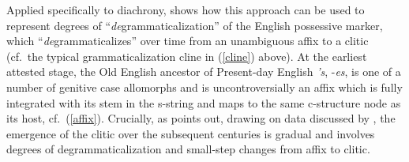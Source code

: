 \documentclass[output=paper,hidelinks]{langscibook}
\begin{document}
\begin{exe}

\ex {}
\end{exe}
\clearpage


Applied specifically to diachrony, \citet{Lowe15} shows how this approach can be used to represent degrees of ``\textit{de}grammaticalization'' of the English possessive marker, which ``\textit{de}grammaticalizes'' over time from an unambiguous affix to a clitic (cf.~the typical grammaticalization cline in (\ref{cline}) above). At the earliest attested stage, the Old English ancestor of Present-day English \textit{'s}, -\textit{es}, is one of a number of genitive case allomorphs and is uncontroversially an affix which is fully integrated with its stem in the s-string and  maps to the same c-structure node as its host, cf.~(\ref{affix}). 
Crucially, as \citet{Lowe15} points out, drawing on data discussed by \citet{allen1997origins,allen2003deflexion,allen2008genitives}, the emergence of the clitic over the subsequent centuries is gradual and involves degrees of degrammaticalization and small-step changes  from affix to clitic. 
\end{document}
